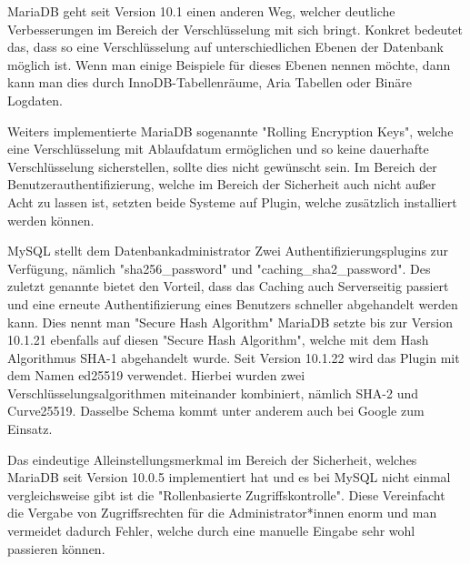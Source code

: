 MariaDB geht seit Version 10.1 einen anderen Weg, welcher deutliche Verbesserungen im Bereich der Verschlüsselung mit sich bringt. Konkret bedeutet das, dass so eine Verschlüsselung auf unterschiedlichen Ebenen der Datenbank möglich ist. Wenn man einige Beispiele für dieses Ebenen nennen möchte, dann kann man dies durch InnoDB-Tabellenräume, Aria Tabellen oder Binäre Logdaten.

Weiters implementierte MariaDB sogenannte "Rolling Encryption Keys", welche eine Verschlüsselung mit Ablaufdatum ermöglichen und so keine dauerhafte Verschlüsselung sicherstellen, sollte dies nicht gewünscht sein.
Im Bereich der Benutzerauthentifizierung, welche im Bereich der Sicherheit auch nicht außer Acht zu lassen ist, setzten beide Systeme auf Plugin, welche zusätzlich installiert werden können.

MySQL stellt dem Datenbankadministrator Zwei Authentifizierungsplugins zur Verfügung, nämlich "sha256\_password" und "caching\_sha2\_password". Des zuletzt genannte bietet den Vorteil, dass das Caching auch Serverseitig passiert und eine erneute Authentifizierung eines Benutzers schneller abgehandelt werden kann. Dies nennt man "Secure Hash Algorithm"
MariaDB setzte bis zur Version 10.1.21 ebenfalls auf diesen "Secure Hash Algorithm", welche mit dem Hash Algorithmus SHA-1 abgehandelt wurde. Seit Version 10.1.22 wird das Plugin mit dem Namen ed25519 verwendet. Hierbei wurden zwei Verschlüsselungsalgorithmen miteinander kombiniert, nämlich SHA-2 und Curve25519. Dasselbe Schema kommt unter anderem auch bei Google zum Einsatz.

Das eindeutige Alleinstellungsmerkmal im Bereich der Sicherheit, welches MariaDB seit Version 10.0.5 implementiert hat und es bei MySQL nicht einmal vergleichsweise gibt ist die "Rollenbasierte Zugriffskontrolle". Diese Vereinfacht die Vergabe von Zugriffsrechten für die Administrator*innen enorm und man vermeidet dadurch Fehler, welche durch eine manuelle Eingabe sehr wohl passieren können.

